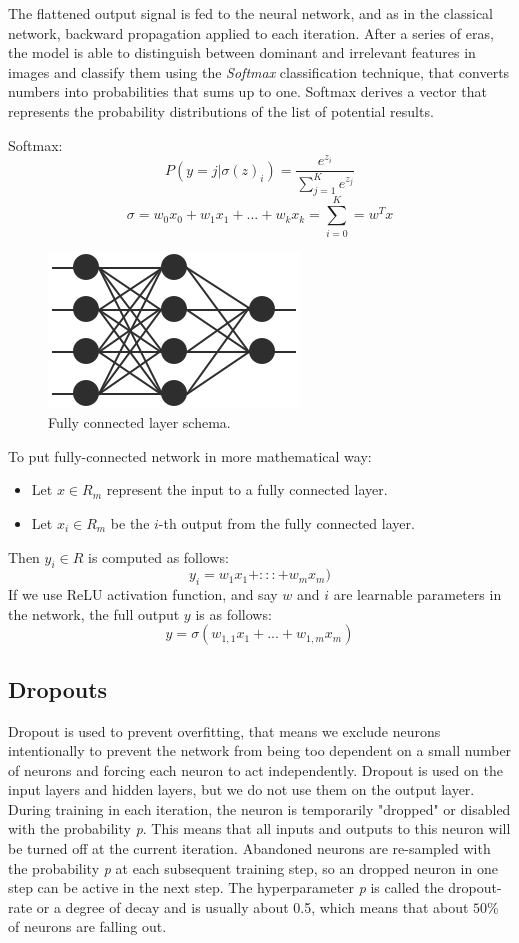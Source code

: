 \documentclass[conference]{IEEEtran}
\begin{document}
The flattened output signal is fed to the neural network, and as in the classical network, backward propagation applied to each iteration. After a series of eras, the model is able to distinguish between dominant and irrelevant features in images and classify them using the \textit{Softmax} classification technique, that converts numbers into probabilities that sums up to one. Softmax derives a vector that represents the probability distributions of the list of potential results.

Softmax:
$$P\left(y=j | \sigma(z)_{i}\right)=\frac{e^{z_{i}}}{\sum_{j=1}^{K}e^{z_{j}}}$$
$$\sigma = w_{0}x_{0} + w_{1}x_{1} + ... + w_{k}x_{k} = \sum_{i=0}^{K} = w^{T}x$$

\begin{figure}[hbt!]
 \centering
    \includegraphics[scale=0.4]{fully_connected_network.png}
        \caption{Fully connected layer schema.}
	    \label{fig:my_label}
\end{figure}


To put fully-connected network in more mathematical way:
\begin{itemize}
    \item Let $x \in R_{m}$ represent the input to a fully connected layer.
    \item Let $x_{i} \in R_{m}$ be the $i$-th output from the fully connected layer.
\end{itemize}
Then $y_{i} \in R$ is computed as follows:
$$y_{i} = w_{1}x_{1} + ::: + w_{m}x_{m})$$
If we use ReLU activation function, and say $w$ and $i$ are learnable parameters in the network, the full output $y$ is as follows:
$$y = \sigma(w_{1,1}x_{1}+...+w_{1, m}x_{m})$$
\subsection{Dropouts}   
Dropout is used to prevent overfitting, that means we exclude neurons intentionally to prevent the network from being too dependent on a small number of neurons and forcing each neuron to act independently. Dropout is used on the input layers and hidden layers, but we do not use them on the output layer. During training in each iteration, the neuron is temporarily "dropped" or disabled with the probability \textit{p}. This means that all inputs and outputs to this neuron will be turned off at the current iteration. Abandoned neurons are re-sampled with the probability \textit{p} at each subsequent training step, so an dropped neuron in one step can be active in the next step. The hyperparameter \textit{p} is called the dropout-rate or a degree of decay and is usually about 0.5, which means that about $50\%$ of neurons are falling out.
\end{document}
